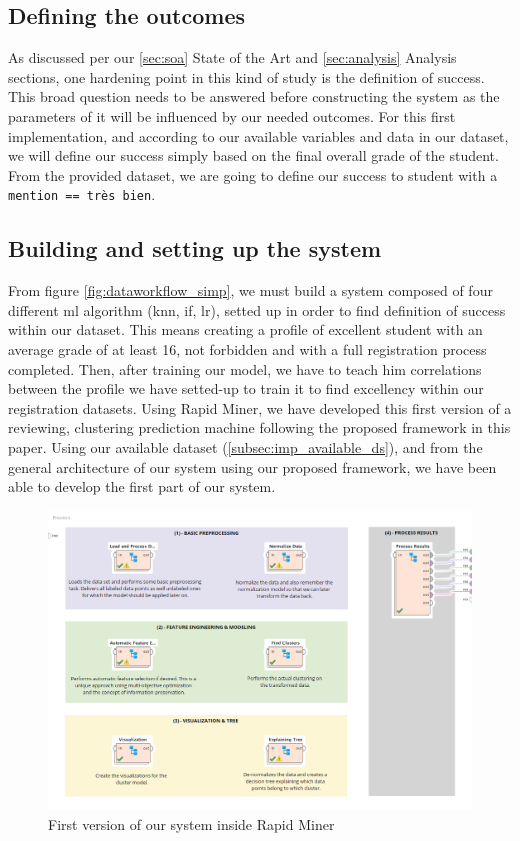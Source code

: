 \documentclass[../main.tex]{subfiles}
\begin{document}
\subsection{Defining the outcomes}

As discussed per our \ref{sec:soa} State of the Art and \ref{sec:analysis} Analysis sections, one hardening point in this kind of study is the definition of success. This broad question needs to be answered before constructing the system as the parameters of it will be influenced by our needed outcomes.
For this first implementation, and according to our available variables and data in our dataset, we will define our success simply based on the final overall grade of the student. 
From the provided dataset, we are going to define our success to student with a \verb|mention == très bien|.

\subsection{Building and setting up the system}

From figure \ref{fig:dataworkflow_simp}, we must build a system composed of four different \acrshort{ml} algorithm (\acrfull{knn}, \acrfull{if}, \acrfull{lr}), setted up in order to find definition of success within our dataset. This means creating a profile of excellent student with an average grade of at least 16, not forbidden and with a full registration process completed. 
Then, after training our model, we have to teach him correlations between the profile we have setted-up to train it to find excellency within our registration datasets.
Using Rapid Miner, we have developed this first version of a reviewing, clustering prediction machine following the proposed framework in this paper.
Using our available dataset (\ref{subsec:imp_available_ds}), and from the general architecture of our system using our proposed framework, we have been able to develop the first part of our system. 

\begin{figure}[H]      
    \includegraphics[width=1\linewidth]{res/diagram/MLv1.png}
    \caption{First version of our system inside Rapid Miner}
    \label{fig:rapidminer_impv1}
\end{figure}
\end{document}
